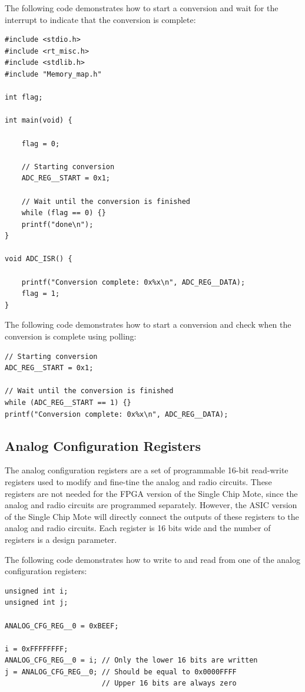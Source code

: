 The following code demonstrates how to start a conversion and wait for the interrupt to indicate that the conversion is complete:
\begin{lstlisting}
#include <stdio.h>
#include <rt_misc.h>
#include <stdlib.h>
#include "Memory_map.h"

int flag;

int main(void) {

    flag = 0;

    // Starting conversion
    ADC_REG__START = 0x1;

    // Wait until the conversion is finished
    while (flag == 0) {}
    printf("done\n");
}

void ADC_ISR() {

    printf("Conversion complete: 0x%x\n", ADC_REG__DATA);
    flag = 1;
}
\end{lstlisting}

The following code demonstrates how to start a conversion and check when the conversion is complete using polling:
\begin{lstlisting}
// Starting conversion
ADC_REG__START = 0x1;

// Wait until the conversion is finished
while (ADC_REG__START == 1) {}
printf("Conversion complete: 0x%x\n", ADC_REG__DATA);
\end{lstlisting}

\subsection{Analog Configuration Registers}
The analog configuration registers are a set of programmable 16-bit read-write registers used to modify and fine-tine the analog and radio circuits. These registers are not needed for the FPGA version of the Single Chip Mote, since the analog and radio circuits are programmed separately. However, the ASIC version of the Single Chip Mote will directly connect the outputs of these registers to the analog and radio circuits. Each register is 16 bits wide and the number of registers is a design parameter.

The following code demonstrates how to write to and read from one of the analog configuration registers:

\begin{lstlisting}
unsigned int i;
unsigned int j;

ANALOG_CFG_REG__0 = 0xBEEF;

i = 0xFFFFFFFF;
ANALOG_CFG_REG__0 = i; // Only the lower 16 bits are written
j = ANALOG_CFG_REG__0; // Should be equal to 0x0000FFFF
                       // Upper 16 bits are always zero
\end{lstlisting}

